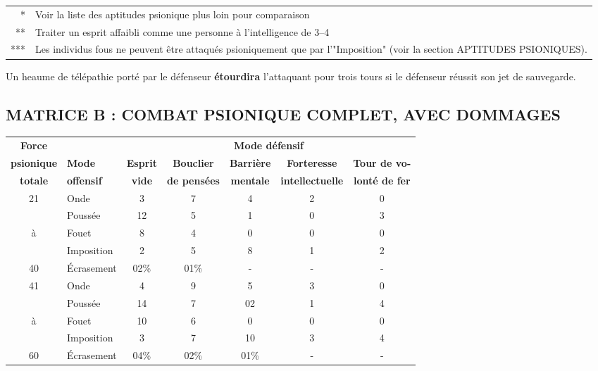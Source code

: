 \documentclass[11pt]{article}
\begin{document}
{\begin{tabular}{rp{15.3cm}}
* & Voir la liste des aptitudes psionique plus loin pour comparaison \\
** & Traiter un esprit affaibli comme une personne à l'intelligence de 3--4 \\
*** & Les individus fous ne peuvent être attaqués psioniquement que par l'"Imposition" (voir la section APTITUDES PSIONIQUES).
\end{tabular}

\medskip

Un heaume de télépathie porté par le défenseur \textbf{étourdira} l'attaquant pour trois tours si le défenseur réussit son jet de sauvegarde.

\subsection*{\normalsize MATRICE B : COMBAT PSIONIQUE COMPLET, AVEC DOMMAGES}

\begin{tabular}{clccccc}
\small\textbf{Force} & & \multicolumn{5}{c}{\small\textbf{Mode défensif}} \\
\small\textbf{psionique} & \small\textbf{Mode} & \small\textbf{Esprit} & \small\textbf{Bouclier} & \small\textbf{Barrière} & \small\textbf{Forteresse} & \small\textbf{Tour de vo-} \\
\small\textbf{totale} & \small\textbf{offensif} & \small\textbf{vide} & \small\textbf{de pensées} & \small\textbf{mentale} & \small\textbf{intellectuelle} & \small\textbf{lonté de fer} \\
21 & Onde       &    3 & 7    & 4 & 2 & 0 \\
   & Poussée    &   12 & 5    & 1 & 0 & 3 \\
à  & Fouet      &    8 & 4    & 0 & 0 & 0 \\
   & Imposition &    2 & 5    & 8 & 1 & 2 \\
40 & Écrasement & 02\% & 01\% & - & - & - \\

41 & Onde       &    4 & 9    & 5    & 3 & 0 \\
   & Poussée    &   14 & 7    & 02   & 1 & 4 \\
à  & Fouet      &   10 & 6    & 0    & 0 & 0 \\
   & Imposition &    3 & 7    & 10   & 3 & 4 \\
60 & Écrasement & 04\% & 02\% & 01\% & - & - \\


\end{tabular}}
\end{document}
